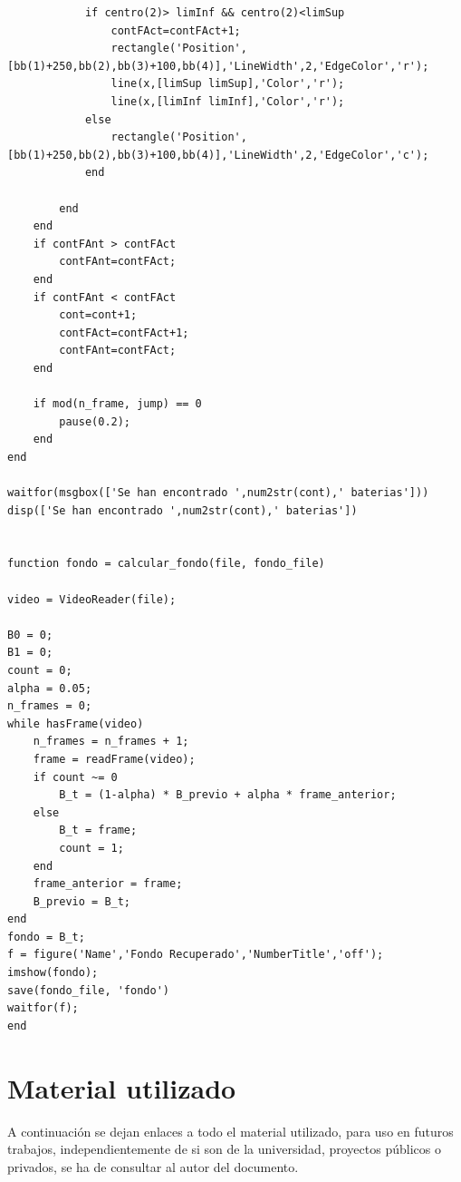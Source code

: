 \documentclass[11pt]{memoir}
\begin{document}
\begin{lstlisting}
            if centro(2)> limInf && centro(2)<limSup
                contFAct=contFAct+1;
                rectangle('Position',[bb(1)+250,bb(2),bb(3)+100,bb(4)],'LineWidth',2,'EdgeColor','r');
                line(x,[limSup limSup],'Color','r');
                line(x,[limInf limInf],'Color','r');
            else
                rectangle('Position',[bb(1)+250,bb(2),bb(3)+100,bb(4)],'LineWidth',2,'EdgeColor','c');
            end
            
        end
    end
    if contFAnt > contFAct
        contFAnt=contFAct;
    end
    if contFAnt < contFAct
        cont=cont+1;
        contFAct=contFAct+1;
        contFAnt=contFAct;
    end
    
    if mod(n_frame, jump) == 0
        pause(0.2);
    end
end

waitfor(msgbox(['Se han encontrado ',num2str(cont),' baterias']))
disp(['Se han encontrado ',num2str(cont),' baterias'])


function fondo = calcular_fondo(file, fondo_file)

video = VideoReader(file);

B0 = 0;
B1 = 0;
count = 0;
alpha = 0.05;
n_frames = 0;
while hasFrame(video)
    n_frames = n_frames + 1;
    frame = readFrame(video);
    if count ~= 0
        B_t = (1-alpha) * B_previo + alpha * frame_anterior;
    else
        B_t = frame;
        count = 1;
    end
    frame_anterior = frame;
    B_previo = B_t;
end
fondo = B_t;
f = figure('Name','Fondo Recuperado','NumberTitle','off');
imshow(fondo);
save(fondo_file, 'fondo')
waitfor(f);
end
\end{lstlisting}

\section{Material utilizado}
A continuación se dejan enlaces a todo el material utilizado, para uso en futuros trabajos, independientemente de si son de la universidad, proyectos públicos o privados, se ha de consultar al autor del documento.
\end{document}
